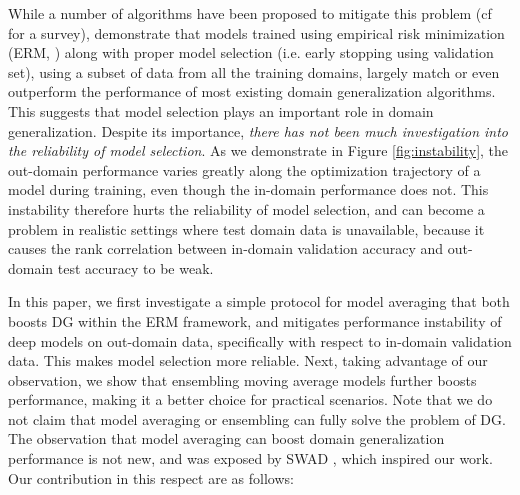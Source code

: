 \documentclass{article}
\begin{document}
While a number of algorithms have been proposed to mitigate this problem (cf \cite{zhou2021domain} for a survey), \cite{gulrajani2020search} demonstrate that models trained using empirical risk minimization (ERM, \cite{vapnik1998statistical}) along with proper model selection (i.e. early stopping using validation set), using a subset of data from all the training domains, largely match or even outperform the performance of most existing domain generalization algorithms. This suggests that model selection plays an important role in domain generalization.
Despite its importance, \textit{there has not been much investigation into the reliability of model selection}.
As we demonstrate in Figure \ref{fig:instability}, the out-domain performance varies greatly along the optimization trajectory of a model during training, even though the in-domain performance does not. This instability therefore hurts the reliability of model selection, and can become a problem in realistic settings where test domain data is unavailable, because it causes the rank correlation between in-domain validation accuracy and out-domain test accuracy to be weak.

In this paper, we first investigate a simple protocol for model averaging that both boosts DG within the ERM framework, and mitigates performance instability of deep models on out-domain data, specifically with respect to in-domain validation data. This makes model selection more reliable. Next, taking advantage of our observation, we show that ensembling moving average models further boosts performance, making it a better choice for practical scenarios. Note that we do not claim that model averaging or ensembling can fully solve the problem of DG. The observation that model averaging can boost domain generalization performance is not new, and was exposed by SWAD \cite{cha2021swad}, which inspired our work. Our contribution in this respect are as follows:
\end{document}

